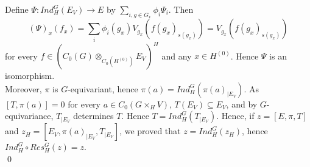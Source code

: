 \begin{dem}
Define $\Psi : Ind_H^G (E_V)\rightarrow E$ by $\sum_{i,g\in G_x}\phi_i \Psi_i$. Then 
\[(\Psi)_x(f_x) =  \sum_{i}\phi_i(g_x)V_{g_x}(f(g_x)_{s(g_x)}) = V_{g_x}(f(g_x)_{s(g_x)})  \]
for every $f\in \left( C_0( G)\otimes_{C_0(H^{(0)})} E_V\right)^H$ and any $x\in H^{(0)}$.  Hence $\Psi$ is an isomorphism.\\ %

Moreover, $\pi$ is $G$-equivariant, hence $\pi(a) = Ind_H^G (\pi(a)_{|E_V} )$. As $[T,\pi(a)]=0$ for every $a\in C_0(G\times_H V)$, $T(E_V)\subseteq E_V$, and by $G$-equivariance, $T_{|E_V}$ determines $T$. Hence $T= Ind_H^G (T_{|E_V})$. Hence, if $z=[E,\pi,T]$ and $z_H =[E_V,\pi(a)_{|E_V},T_{|E_V}]$, we proved that $z = Ind_H^G( z_H)$, hence $Ind_H^G \circ Res_H^G (z)= z$.\\
\qed  
\end{dem}




